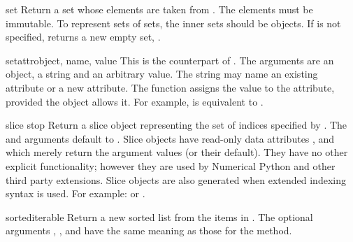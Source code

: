 \begin{funcdesc}{set}{}
  Return a set whose elements are taken from .  The elements
  must be immutable.  To represent sets of sets, the inner sets should
  be  objects.  If  is not specified,
  returns a new empty set, .
\end{funcdesc}

\begin{funcdesc}{setattr}{object, name, value}
  This is the counterpart of .  The arguments are an
  object, a string and an arbitrary value.  The string may name an
  existing attribute or a new attribute.  The function assigns the
  value to the attribute, provided the object allows it.  For example,
   is equivalent to
  .
\end{funcdesc}

\begin{funcdesc}{slice}{ stop}
  Return a slice object representing the set of indices specified by
  .  The 
  and  arguments default to .  Slice objects have
  read-only data attributes ,  and
   which merely return the argument values (or their
  default).  They have no other explicit functionality; however they
  are used by Numerical Python and other third
  party extensions.  Slice objects are also generated when extended
  indexing syntax is used.  For example:  or
  .
\end{funcdesc}

\begin{funcdesc}{sorted}{iterable}
  Return a new sorted list from the items in .
  The optional arguments , , and 
  have the same meaning as those for the  method.
\end{funcdesc}


